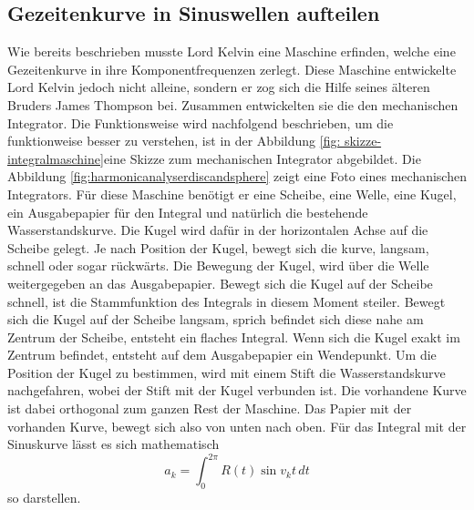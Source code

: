 \subsection{Gezeitenkurve in Sinuswellen aufteilen
	\label{gezeiten:subsection:malorum}}
Wie bereits beschrieben musste Lord Kelvin eine Maschine erfinden, welche eine Gezeitenkurve in ihre Komponentfrequenzen zerlegt.
Diese Maschine entwickelte Lord Kelvin jedoch nicht alleine, sondern er zog sich die Hilfe seines älteren Bruders James Thompson bei.
Zusammen entwickelten sie die den mechanischen Integrator.
Die Funktionsweise wird nachfolgend beschrieben, um die funktionweise besser zu verstehen, ist in der Abbildung  \ref{fig: skizze-integralmaschine}eine Skizze zum mechanischen Integrator abgebildet.
Die Abbildung \ref{fig:harmonicanalyserdiscandsphere} zeigt eine Foto eines mechanischen Integrators.
Für diese Maschine benötigt er eine Scheibe, eine Welle, eine Kugel, ein Ausgabepapier für den Integral und natürlich die bestehende Wasserstandskurve.
Die Kugel wird dafür in der horizontalen Achse auf die Scheibe gelegt.
Je nach Position der Kugel, bewegt sich die kurve, langsam, schnell oder sogar rückwärts.
Die Bewegung der Kugel, wird über die Welle weitergegeben an das Ausgabepapier.
Bewegt sich die Kugel auf der Scheibe schnell, ist die Stammfunktion des Integrals in diesem Moment steiler.
Bewegt sich die Kugel auf der Scheibe langsam, sprich befindet sich diese nahe am Zentrum der Scheibe, entsteht ein flaches Integral.
Wenn sich die Kugel exakt im Zentrum befindet, entsteht auf dem Ausgabepapier ein Wendepunkt.
Um die Position der Kugel zu bestimmen, wird mit einem Stift die Wasserstandskurve nachgefahren, wobei der Stift mit der Kugel verbunden ist.
Die vorhandene Kurve ist dabei orthogonal zum ganzen Rest der Maschine.
Das Papier mit der vorhanden Kurve, bewegt sich also von unten nach oben.
Für das Integral mit der Sinuskurve lässt es sich mathematisch \[
a_k
=  
\int_0^{2\pi} R(t) \sin v_kt \, dt
\]
so darstellen.


